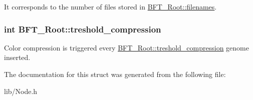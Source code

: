 It corresponds to the number of files stored in \hyperlink{structBFT__Root_a8022a504e2c0dd2d800efda892413ce7}{B\+F\+T\+\_\+\+Root\+::filenames}. \hypertarget{structBFT__Root_ac791b1bb0df480c8574095bf0444cc64}{}
\subsubsection[{treshold\+\_\+compression}]{\setlength{\rightskip}{0pt plus 5cm}int B\+F\+T\+\_\+\+Root\+::treshold\+\_\+compression}\label{structBFT__Root_ac791b1bb0df480c8574095bf0444cc64}


Color compression is triggered every \hyperlink{structBFT__Root_ac791b1bb0df480c8574095bf0444cc64}{B\+F\+T\+\_\+\+Root\+::treshold\+\_\+compression} genome inserted. 



The documentation for this struct was generated from the following file\+:\begin{DoxyCompactItemize}
\item 
lib/Node.\+h\end{DoxyCompactItemize}
